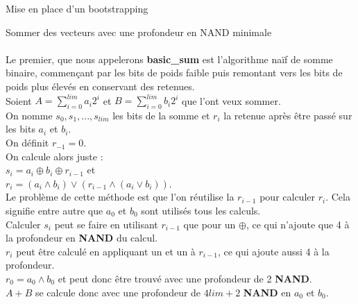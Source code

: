 \begin{section}{Mise en place d'un bootstrapping}
\begin{subsection}{Sommer des vecteurs avec une profondeur en NAND minimale}
\paragraph{}

Le premier, que nous appelerons \textbf{basic\_sum} est l'algorithme naïf de somme binaire, commençant par les bits de poids faible puis remontant vers les bits de poids plus élevés en conservant des retenues. \\
Soient $A = \sum\limits_{i=0}^{lim} a_i 2^i$ et $B = \sum\limits_{i=0}^{lim} b_i 2^i$ que l'ont veux sommer. \\
On nomme $s_0, s_1, ..., s_{lim}$ les bits de la somme et $r_i$ la retenue après être passé sur les bits $a_i$ et $b_i$. \\
On définit $r_{-1} = 0$. \\
On calcule alors juste : \\
$s_i = a_i \oplus b_i \oplus r_{i-1}$ et \\
$r_i = (a_i \land b_i) \lor (r_{i-1} \land (a_i \lor b_i))$. \\
Le problème de cette méthode est que l'on réutilise la $r_{i-1}$ pour calculer $r_i$. Cela signifie entre autre que $a_0$ et $b_0$ sont utilisés tous les calculs. \\
Calculer $s_i$ peut se faire en utilisant $r_{i-1}$ que pour un $\oplus$, ce qui n'ajoute que 4 à la profondeur en \textbf{NAND} du calcul. \\
$r_i$ peut être calculé en appliquant un  et un  à $r_{i-1}$, ce qui ajoute aussi 4 à la profondeur. \\
$r_0 = a_0 \land b_0$ et peut donc être trouvé avec une profondeur de 2 \textbf{NAND}. \\
$A + B$ se calcule donc avec une profondeur de $4 lim + 2$ \textbf{NAND} en $a_0$ et $b_0$.

\paragraph{}


\end{subsection}
\end{section}
